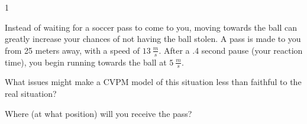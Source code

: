 
\AddToShipoutPicture*{\BackgroundPic}

\addtocounter {ProbNum} {1}

 
{\bf \Large{}} Instead of waiting for a soccer pass to come to you, moving towards the ball can greatly increase your chances of not having the ball stolen.  A pass is made to you from 25 meters away, with a speed of ${13~\tfrac{m}{s}}$.  After a .4 second pause (your reaction time), you begin running towards the ball at ${5~\tfrac{m}{s}}$.

\bigskip
What issues might make a CVPM model of this situation less than faithful to the real situation?

\vspace{30mm}
Where (at what position) will you receive the pass?

 
\vfill

\newpage